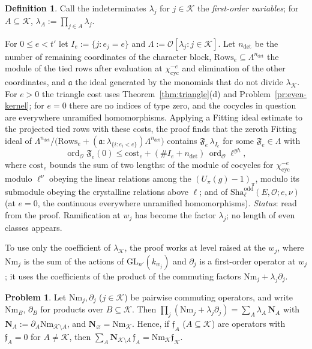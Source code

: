 \documentclass[reqno]{amsart}
\theoremstyle{definition}
\newtheorem{problem}{Problem}[section]
\newtheorem{definition}{Definition}[section]
\theoremstyle{plain}
\newcommand{\Oc}{\mathcal{O}}
\newcommand{\Kc}{\mathcal{K}}
\newcommand{\cyc}{\chi_{\mathrm{cyc}}}
\newcommand{\Nm}{\mathrm{Nm}}
\newcommand{\ord}{\operatorname{ord}}
\newcommand{\Shao}{\mathrm{Sha}^{\mathrm{odd}}}
\begin{document}
\begin{definition}\label{def:lambda}
Call the indeterminates \(\lambda_j\) for \(j \in \Kc\) the \emph{first-order variables}; for \(A \subseteq \Kc\), \(\lambda_A := \prod_{j \in A}\lambda_j\).
\end{definition}

For \(0 \le e < t'\) let \(I_e := \{j : e_j = e\}\) and \(\Lambda := \Oc[\lambda_j : j \in \Kc]\).  Let \(n_{\det}\) be the number of remaining coordinates of the character block, \(\mathrm{Rows}_e \subseteq \Lambda^{n_{\det}}\) the module of the tied rows after evaluation at \(\cyc^{-e}\) and elimination of the other coordinates, and \(\mathfrak a\) the ideal generated by the monomials that do not divide \(\lambda_{\Kc}\).  For \(e > 0\) the triangle cost uses Theorem~\ref{thm:triangle}(d) and Problem~\ref{pr:even-kernel}; for \(e = 0\) there are no indices of type zero, and the cocycles in question are everywhere unramified homomorphisms.  Applying a Fitting ideal estimate to the projected tied rows with these costs, the proof finds that the zeroth Fitting ideal of \(\Lambda^{n_{\det}}/\bigl(\mathrm{Rows}_e + (\mathfrak a : \lambda_{\{i : e_i < e\}})\Lambda^{n_{\det}}\bigr)\) contains \(\mathfrak F_e\,\lambda_{I_e}\) for some \(\mathfrak F_e \in \Lambda\) with
\[
  \ord_{\Oc} \mathfrak F_e(0) \le \mathrm{cost}_e + (\#I_e + n_{\det})\,\ord_{\Oc} \ell^{yh} ,
\]
where \(\mathrm{cost}_e\) bounds the sum of two lengths: of the module of cocycles for \(\cyc^{-e}\) modulo \(\ell^\nu\) obeying the linear relations among the \((U_\pi(g) - 1)_\pi\), modulo its submodule obeying the crystalline relations above \(\ell\); and of \(\Shao_\ell(E,\Oc;e,\nu)\) (at \(e = 0\), the continuous everywhere unramified homomorphisms).  \emph{Status}: read from the proof.  Ramification at \(w_j\) has become the factor \(\lambda_j\); no length of even classes appears.

To use only the coefficient of \(\lambda_{\Kc}\), the proof works at level raised at the \(w_j\), where \(\Nm_j\) is the sum of the actions of \(\mathrm{GL}_{n'}(k_{w_j})\) and \(\partial_j\) is a first-order operator at \(w_j\); it uses the coefficients of the product of the commuting factors \(\Nm_j + \lambda_j\partial_j\).

\begin{problem}\label{pr:top-coefficient}
Let \(\Nm_j, \partial_j\) (\(j \in \Kc\)) be pairwise commuting operators, and write \(\Nm_B\), \(\partial_B\) for products over \(B \subseteq \Kc\).  Then \(\prod_j(\Nm_j + \lambda_j\partial_j) = \sum_{A}\lambda_A\,\mathbf N_A\) with \(\mathbf N_A := \partial_A\Nm_{\Kc \setminus A}\), and \(\mathbf N_\varnothing = \Nm_{\Kc}\).  Hence, if \(\mathfrak f_A\) (\(A \subseteq \Kc\)) are operators with \(\mathfrak f_A = 0\) for \(A \ne \Kc\), then \(\sum_A \mathbf N_{\Kc\setminus A}\,\mathfrak f_A = \Nm_{\Kc} \mathfrak f_{\Kc}\).
\end{problem}
\end{document}
